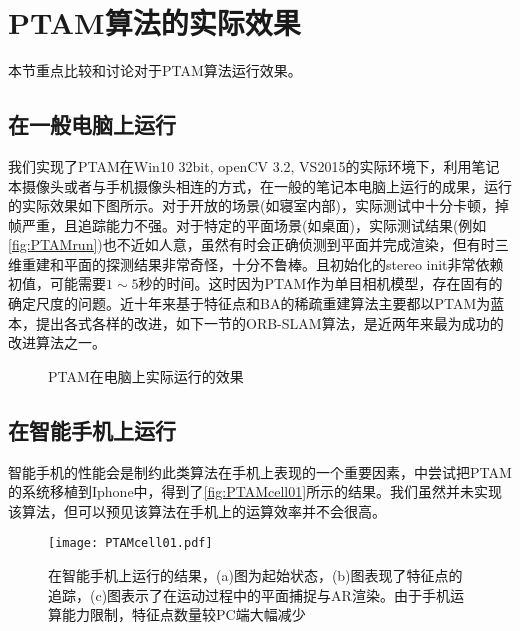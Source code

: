 \section{PTAM算法的实际效果}

本节重点比较和讨论对于PTAM算法运行效果。

\subsection{在一般电脑上运行}

我们实现了PTAM在Win10 32bit, openCV 3.2, VS2015的实际环境下，利用笔记本摄像头或者与手机摄像头相连的方式，在一般的笔记本电脑上运行的成果，运行的实际效果如下图所示。对于开放的场景(如寝室内部)，实际测试中十分卡顿，掉帧严重，且追踪能力不强。对于特定的平面场景(如桌面)，实际测试结果(例如\autoref{fig:PTAMrun})也不近如人意，虽然有时会正确侦测到平面并完成渲染，但有时三维重建和平面的探测结果非常奇怪，十分不鲁棒。且初始化的stereo init非常依赖初值，可能需要$1\sim5$秒的时间。这时因为PTAM作为单目相机模型，存在固有的确定尺度的问题。近十年来基于特征点和BA的稀疏重建算法主要都以PTAM为蓝本，提出各式各样的改进，如下一节的ORB-SLAM算法，是近两年来最为成功的改进算法之一。

\begin{figure}[!htbp]
\centering 
{}
\caption{PTAM在电脑上实际运行的效果}
\label{fig:PTAMrun}
\end{figure}

\subsection{在智能手机上运行}

智能手机的性能会是制约此类算法在手机上表现的一个重要因素，\cite{Klein2009}中尝试把PTAM的系统移植到Iphone中，得到了\autoref{fig:PTAMcell01}所示的结果。我们虽然并未实现该算法，但可以预见该算法在手机上的运算效率并不会很高。

\begin{figure}[!htbp]
\centering
\texttt{[image: PTAMcell01.pdf]}
\caption{在智能手机上运行的结果，(a)图为起始状态，(b)图表现了特征点的追踪，(c)图表示了在运动过程中的平面捕捉与AR渲染。由于手机运算能力限制，特征点数量较PC端大幅减少}
\label{fig:PTAMcell01}
\end{figure}
